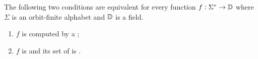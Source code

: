\begin{theorem}\label{thm:orbit-finite-fliess}
    The following two conditions are equivalent for every function
    $f : \Sigma^* \to \mathbb D$
    where $\Sigma$ is an orbit-finite alphabet and $\mathbb D$ is a field.
    \begin{enumerate}
      \item \label{it:fliess-weighted} $f$ is computed by a ;
      \item \label{it:fliess-derivatives} $f$ is  and its set of
         is .
    \end{enumerate}
\end{theorem}
